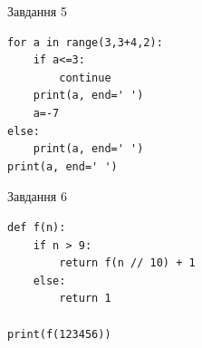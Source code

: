 \documentclass[12pt, ukrainian]{article}
\begin{document}
{\vspace{15mm}
\begin{minipage}[t]{9.7cm}                
{\begin{center}Завдання {5}\end{center}}
\begin{verbatim}
for a in range(3,3+4,2):
    if a<=3:
        continue
    print(a, end=' ')
    a=-7
else:
    print(a, end=' ')
print(a, end=' ')
\end{verbatim}     
\end{minipage}
\vline \hspace{8mm}
\begin{minipage}[t]{8.0cm}                
{\begin{center}Завдання {6}\end{center}}
\begin{verbatim}
def f(n):
    if n > 9:
        return f(n // 10) + 1
    else:
        return 1

print(f(123456))
\end{verbatim}     
\end{minipage}

}
\newpage
\end{document}
